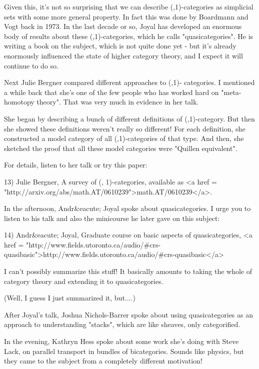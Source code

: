 Given this, it's not so surprising that we can describe
(\infty ,1)-categories as simplicial sets with some more general
property.  In fact this was done by Boardmann and Vogt back in 1973.
In the last decade or so, Joyal has developed an enormous body of
results about these (\infty ,1)-categories, which he calls
"quasicategories".  He is writing a book on the subject,
which is not quite done yet - but it's already enormously influenced
the state of higher category theory, and I expect it will continue to
do so.

Next Julie Bergner compared different approaches to (\infty ,1)-
categories.  I mentioned a while back that she's one of the few people
who has worked hard on "meta-homotopy theory".  That was
very much in evidence in her talk.

She began by describing a bunch of different definitions of 
(\infty ,1)-category.  But then she showed these definitions
weren't really so different!  For each definition, she constructed 
a model category of all (\infty ,1)-categories of that type.   
And then, she sketched the proof that all these model categories 
were "Quillen equivalent".  

For details, listen to her talk or try this paper:

13) Julie Bergner, A survey of (\infty , 1)-categories,
available as <a href = "http://arxiv.org/abs/math.AT/0610239">math.AT/0610239</a>.

In the afternoon, Andr&eacute; Joyal spoke about quasicategories.
I urge you to listen to his talk and also the minicourse he
later gave on this subject:

14) Andr&eacute; Joyal, Graduate course on basic aspects of 
quasicategories, <a href = "http://www.fields.utoronto.ca/audio/#crs-quasibasic">http://www.fields.utoronto.ca/audio/#crs-quasibasic</a>

I can't possibly summarize this stuff!  It basically amounts to
taking the whole of category theory and extending it to 
quasicategories.  

(Well, I guess I just summarized it, but....)

After Joyal's talk, Joshua Nichols-Barrer spoke about using
quasicategories as an approach to understanding "stacks",
which are like sheaves, only categorified.

In the evening, Kathryn Hess spoke about some work she's doing
with Steve Lack, on parallel transport in bundles of bicategories.
Sounds like physics, but they came to the subject from a completely
different motivation!

